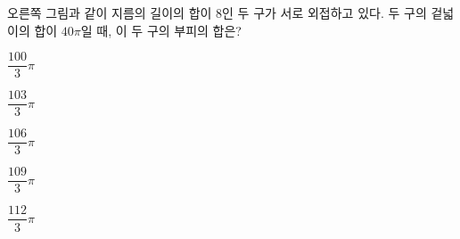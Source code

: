 \noindent\begin{minipage}[t]{0.58\linewidth}\vspace{0pt}\raggedright 오른쪽 그림과 같이 지름의 길이의 합이 8인 두 구가 서로 외접하고 있다. 두 구의 겉넓이의 합이 $40\pi$일 때, 이 두 구의 부피의 합은?\end{minipage}\hfill\begin{minipage}[t]{0.4\linewidth}\vspace{0pt}\centering \resizebox{\ifdim\width>\linewidth\linewidth\else\width\fi}{!}{}\end{minipage}\par
\begin{choices32}{\rule[-3ex]{0pt}{8ex}$\dfrac{100}{3}\pi$}{\rule[-3ex]{0pt}{8ex}$\dfrac{103}{3}\pi$}{\rule[-3ex]{0pt}{8ex}$\dfrac{106}{3}\pi$}{\rule[-3ex]{0pt}{8ex}$\dfrac{109}{3}\pi$}{\rule[-3ex]{0pt}{8ex}$\dfrac{112}{3}\pi$}\end{choices32}
